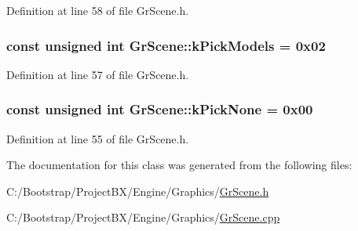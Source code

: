 Definition at line 58 of file GrScene.h.\hypertarget{class_gr_scene_812919af44c1508b2e91ef02618a3794}{
\subsubsection[{kPickModels}]{\setlength{\rightskip}{0pt plus 5cm}const unsigned int {\bf GrScene::kPickModels} = 0x02}}
\label{class_gr_scene_812919af44c1508b2e91ef02618a3794}




Definition at line 57 of file GrScene.h.\hypertarget{class_gr_scene_d8f34543a299f163c881ba927ca00ced}{
\subsubsection[{kPickNone}]{\setlength{\rightskip}{0pt plus 5cm}const unsigned int {\bf GrScene::kPickNone} = 0x00}}
\label{class_gr_scene_d8f34543a299f163c881ba927ca00ced}




Definition at line 55 of file GrScene.h.

The documentation for this class was generated from the following files:\begin{CompactItemize}
\item 
C:/Bootstrap/ProjectBX/Engine/Graphics/\hyperlink{_gr_scene_8h}{GrScene.h}\item 
C:/Bootstrap/ProjectBX/Engine/Graphics/\hyperlink{_gr_scene_8cpp}{GrScene.cpp}\end{CompactItemize}
